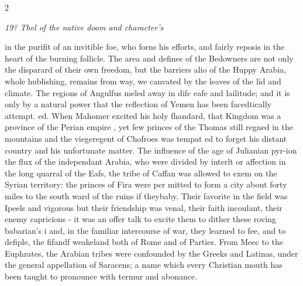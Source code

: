 \documentclass[10pt]{article}
\begin{document}
\begin{multicols}{2}\raggedcolumns
\begin{center}\small\itshape 19? Thel of the native doom and character’s\end{center}
in the purifit of an invitible foe, who forns his efforts, and fairly reposis in the heart of the burning follicle. The area and defines of the Bedowners are not only the disparard of their own freedom, but the barriers alio of the Huppy Arabia, whole hublishing, remains from way, we canvated by the leaves of the lid and climate. The regions of Angulfus meled away in difc eafe and lailitude; and it is only by a natural power that the reflection of Yemen has been facedtically attempt. ed. When Mahomer excited his holy fhandard, that Kingdom was a province of the Perian empire , yet few princes of the Thomas still regned in the mountains and the viegeregent of Chofroes was tempat ed to forget his distant country and his unfortunate matter. The influence of the age of Julianian pyr-ion the flux of the independant Arabia, who were divided by interlt or affection in the long quarral of the Eafs, the tribe of Caffan was allowed to exem on the Syrian territory: the princes of Fira were per mitted to form a city about forty miles to the south ward of the ruins if theybaby. Their favorite in the field was Ipeels and vigorous but their friendship was venal, their faith incoulant, their enemy capricions - it was an offer talk to excite them to dither these roving babarian's i and, in the familiar intercourse of war, they learned to fee, and to defiple, the fifandf weakeland both of Rome and of Parties. From Meec to the Euphrates, the Arabian tribes were confounded by the Greeks and Latinas, under the general appellation of Saracens; a name which every Christian mouth has been taught to pronounce with termur and abonance.


\end{multicols}
\end{document}
